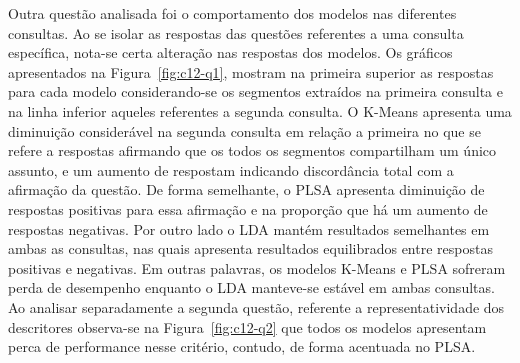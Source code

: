 Outra questão analisada foi o comportamento dos modelos nas diferentes consultas. Ao se isolar as respostas das questões referentes a uma consulta específica, nota-se certa alteração nas respostas dos modelos. 
Os gráficos apresentados na Figura~\ref{fig:c12-q1}, mostram na primeira superior as respostas para cada modelo considerando-se os segmentos extraídos na primeira consulta e na linha inferior aqueles referentes a segunda consulta. O K-Means apresenta uma diminuição considerável na segunda consulta em relação a primeira no que se refere a respostas afirmando que os todos os segmentos compartilham um único assunto, e um aumento de respostam indicando discordância total com a afirmação da questão.
De forma semelhante, o PLSA apresenta diminuição de respostas positivas para essa afirmação e na proporção que há um aumento de respostas negativas. 
Por outro lado o LDA mantém resultados semelhantes em ambas as consultas, nas quais apresenta resultados equilibrados entre respostas positivas e negativas. Em outras palavras, os modelos K-Means e PLSA sofreram perda de desempenho enquanto o LDA manteve-se estável em ambas consultas.
Ao analisar separadamente a segunda questão, referente a representatividade dos descritores observa-se na Figura~\ref{fig:c12-q2} que todos os modelos apresentam perca de performance nesse critério, contudo, de forma acentuada no PLSA. 








